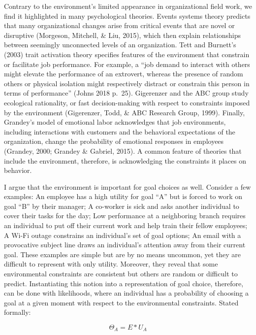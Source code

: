 \documentclass[english,man]{apa6}
\theoremstyle{definition}
\theoremstyle{definition}
\theoremstyle{definition}
\theoremstyle{remark}
\begin{document}
Contrary to the environment's limited appearance in organizational field
work, we find it highlighted in many psychological theories. Events
systems theory predicts that many organizational changes arise from
critical events that are novel or disruptive (Morgeson, Mitchell, \&
Liu, 2015), which then explain relationships between seemingly
unconnected levels of an organization. Tett and Burnett's (2003) trait
activation theory specifies features of the environment that constrain
or facilitate job performance. For example, a \enquote{job demand to
interact with others might elevate the performance of an extrovert,
whereas the presence of random others or physical isolation might
respectively distract or constrain this person in terms of performance}
(Johns 2018 p.~25). Gigerenzer and the ABC group study ecological
rationality, or fast decision-making with respect to constraints imposed
by the environment (Gigerenzer, Todd, \& ABC Research Group, 1999).
Finally, Grandey's model of emotional labor acknowledges that job
environments, including interactions with customers and the behavioral
expectations of the organization, change the probability of emotional
responses in employees (Grandey, 2000; Grandey \& Gabriel, 2015). A
common feature of theories that include the environment, therefore, is
acknowledging the constraints it places on behavior.

I argue that the environment is important for goal choices as well.
Consider a few examples: An employee has a high utility for goal
\enquote{A} but is forced to work on goal \enquote{B} by their manager;
A co-worker is sick and asks another individual to cover their tasks for
the day; Low performance at a neighboring branch requires an individual
to put off their current work and help train their fellow employees; A
Wi-Fi outage constrains an individual's set of goal options; An email
with a provocative subject line draws an individual's attention away
from their current goal. These examples are simple but are by no means
uncommon, yet they are difficult to represent with only utility.
Moreover, they reveal that some environmental constraints are consistent
but others are random or difficult to predict. Instantiating this notion
into a representation of goal choice, therefore, can be done with
likelihoods, where an individual has a probability of choosing a goal at
a given moment with respect to the environmental constraints. Stated
formally:

\begin{equation}
\Theta_{A} = E * U_{A}
\end{equation}
\end{document}
